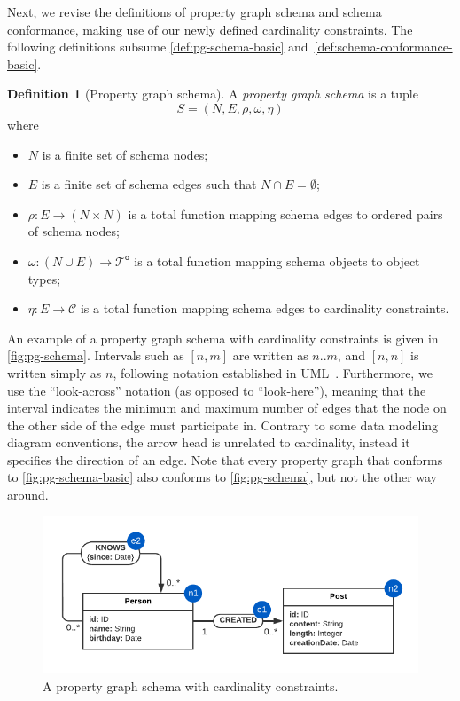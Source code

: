 \documentclass{report}
\theoremstyle{definition}
\newtheorem{definition}{Definition}
\newcommand{\otypes}{\mathcal{T}^\mathsf{o}}
\begin{document}
Next, we revise the definitions of property graph schema and schema conformance, making use of our newly defined cardinality constraints. The following definitions subsume \autoref{def:pg-schema-basic} and~\ref{def:schema-conformance-basic}.

\begin{definition}[Property graph schema]
  \label{def:pg-schema}
  A \emph{property graph schema} is a tuple $$S = (N, E, \rho, \omega, \eta)$$ where
  \begin{itemize}
    \item $N$ is a finite set of schema nodes;
    \item $E$ is a finite set of schema edges such that $N \cap E = \emptyset$;
    \item $\rho : E \to (N \times N)$ is a total function mapping schema edges to ordered pairs of schema nodes;
    \item $\omega : (N \cup E) \to \otypes$ is a total function mapping schema objects to object types;
    \item $\eta : E \to \mathcal{C}$ is a total function mapping schema edges to cardinality constraints.
  \end{itemize}
\end{definition}

An example of a property graph schema with cardinality constraints is given in \autoref{fig:pg-schema}. Intervals such as $[n, m]$ are written as $n..m$, and $[n, n]$ is written simply as $n$, following notation established in UML~\citep{uml}. Furthermore, we use the ``look-across'' notation (as opposed to ``look-here''), meaning that the interval indicates the minimum and maximum number of edges that the node on the other side of the edge must participate in. Contrary to some data modeling diagram conventions, the arrow head is unrelated to cardinality, instead it specifies the direction of an edge. Note  that every property graph that conforms to \autoref{fig:pg-schema-basic} also conforms to \autoref{fig:pg-schema}, but not the other way around.

\begin{figure}[t]
  \centering
  \includegraphics{figures/pg-schema.pdf}
  \caption[A property graph schema with cardinality constraints]{A property graph schema with cardinality constraints.}
  \label{fig:pg-schema}
\end{figure}
\end{document}
